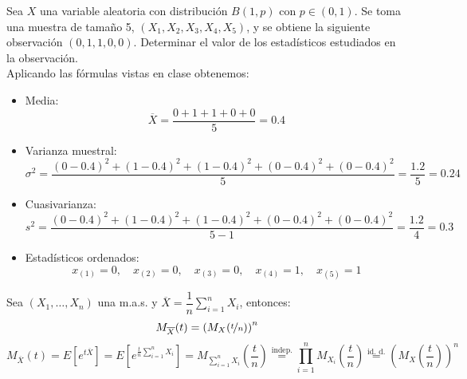 \begin{ejercicio}
    Sea $X$ una variable aleatoria con distribución $B(1,p)$ con $p\in (0,1)$. Se toma una muestra de tamaño 5, $(X_1, X_2, X_3, X_4, X_5)$, y se obtiene la siguiente observación $(0,1,1,0,0)$. Determinar el valor de los estadísticos estudiados en la observación.\\

    \noindent
    Aplicando las fórmulas vistas en clase obtenemos:
    \begin{itemize}
        \item Media:
        \begin{equation*}
            \overline{X} = \dfrac{0+1+1+0+0}{5} = 0.4
        \end{equation*}
        \item Varianza muestral:
        \begin{equation*}
            \sigma^2 = \dfrac{(0-0.4)^2 + (1-0.4)^2 + (1-0.4)^2 + (0-0.4)^2 + (0-0.4)^2}{5} = \dfrac{1.2}{5} = 0.24
        \end{equation*}
        \item Cuasivarianza:
        \begin{equation*}
            s^2 = \dfrac{(0-0.4)^2 + (1-0.4)^2 + (1-0.4)^2 + (0-0.4)^2 + (0-0.4)^2}{5-1} =
            \dfrac{1.2}{4} = 0.3
        \end{equation*}
        \item Estadísticos ordenados:
        \begin{equation*}
            x_{(1)} = 0, \quad x_{(2)} = 0, \quad x_{(3)} = 0, \quad x_{(4)} = 1, \quad x_{(5)} = 1
        \end{equation*}
    \end{itemize}
\end{ejercicio}

\begin{ejercicio}
    Sea $(X_1, \ldots, X_n)$ una m.a.s. y $\overline{X} = \dfrac{1}{n}\sum\limits_{i=1}^{n}X_i$, entonces:
    \begin{equation*}
        M_{\overline{X}}(t) = {(M_X(\nicefrac{t}{n}))}^{n}
    \end{equation*}
    \begin{equation*}
        M_{\overline{X}}(t) = E\left[e^{t\overline{X}}\right] = E\left[e^{\frac{t}{n}\sum\limits_{i=1}^{n}X_i}\right] = M_{\sum\limits_{i=1}^{n}X_i}\left(\frac{t}{n}\right) \stackrel{\text{indep.}}{=} \prod_{i=1}^{n} M_{X_i}\left(\frac{t}{n}\right) \stackrel{\text{id. d.}}{=} {\left(M_X\left(\frac{t}{n}\right)\right)}^{n}
    \end{equation*}
\end{ejercicio}

